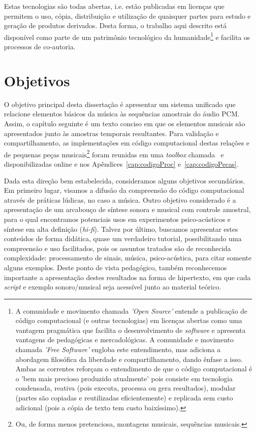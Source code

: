 Estas tecnologias são todas abertas, i.e. estão publicadas em licenças que permitem o uso, cópia, distribuição e utilização de quaisquer partes para estudo e geração de produtos derivados. Desta forma, o trabalho aqui descrito está disponível como parte de um patrimônio tecnológico da humanidade\footnote{A comunidade e movimento chamada \emph{'Open Source'} entende a publicação de código computacional (e outras tecnologias) em licenças abertas como uma vantagem pragmática que facilita o desenvolvimento de \emph{software} e apresenta vantagens de pedagógicas e mercadológicas. A comunidade e movimento chamada \emph{'Free Software'} engloba este entendimento, mas adiciona a abordagem filosófica da liberdade e compartilhamento, dando ênfase a isso. Ambas as correntes reforçam o entendimento de que o código computacional é o 'bem mais precioso produzido atualmente' pois consiste em tecnologia condensada, reativa (pois executa, processa ou gera resultados), modular (partes são copiadas e reutilizadas eficientemente) e replicada sem custo adicional (pois a cópia de texto tem custo baixíssimo).\cite{Raymond,Lessig}} e facilita os processos de co-autoria.

    \section{Objetivos}
   \label{sec:objetivos}
O objetivo principal desta dissertação é apresentar um sistema unificado que relacione elementos básicos da música às sequências amostrais do áudio PCM. Assim, o capítulo seguinte é um texto conciso em que os elementos musicais são apresentados junto às amostras temporais resultantes. Para validação e compartilhamento, as implementações em código computacional destas relações e de pequenas peças musicais\footnote{Ou, de forma menos pretenciosa, montagens musicais, sequências musicais.} foram reunidas em uma \emph{toolbox} chamada \massa\ e disponibilizadas online e nos Apêndices~\ref{cap:codigoProc} e~\ref{cap:codigoPecas}. 

Dada esta direção bem estabelecida, consideramos alguns objetivos secundários. Em primeiro lugar, visamos a difusão da compreensão do código computacional através de práticas lúdicas, no caso a música. Outro objetivo considerado é a apresentação de um arcabouço de síntese sonora e musical com controle amostral, para o qual encontramos potenciais usos em experimentos psico-acústicos e síntese em alta definição (\emph{hi-fi}). Talvez por último, buscamos apresentar estes conteúdos de forma didática, quase um verdadeiro tutorial, possibilitando uma compreensão e uso facilitados, pois os assuntos tratados são de reconhecida complexidade: processamento de sinais, música, psico-acústica, para citar somente alguns exemplos. Deste ponto de vista pedagógico, também reconhecemos importante a apresentação destes resultados na forma de hipertexto, em que cada \emph{script} e exemplo sonoro/musical seja acessível junto ao material teórico.
  
